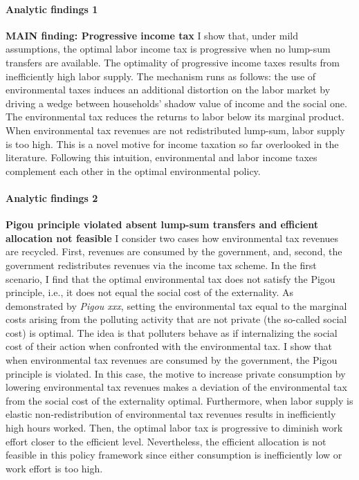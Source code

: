\paragraph{Analytic findings 1}
\textbf{MAIN finding: Progressive income tax} I show that, under mild assumptions, the optimal labor income tax is progressive when no lump-sum transfers are available. 
The optimality of progressive income taxes results from inefficiently high labor supply. The mechanism runs as follows: the use of environmental taxes induces an additional distortion on the labor market by driving a wedge between households' shadow value of income and the social one. The environmental tax reduces the returns to labor below its marginal product. When environmental tax revenues are not redistributed lump-sum, labor supply is too high. 
This is a novel motive for income taxation so far overlooked in the literature.
Following this intuition, environmental and labor income taxes complement each other in the optimal environmental policy.
  
\paragraph{Analytic findings 2}
\textbf{Pigou principle violated absent lump-sum transfers and efficient allocation not feasible}
I consider two cases how environmental tax revenues are recycled. First, revenues are consumed by the government, and, second, the government redistributes revenues via the income tax scheme. In the first scenario, I find that the optimal environmental tax does not satisfy the Pigou principle, i.e., it does not equal the social cost of the externality. As demonstrated by \textit{Pigou xxx}, setting the environmental tax equal to the marginal costs arising from the polluting activity that are not private (the so-called social cost) is optimal. The idea is that polluters behave as if internalizing the social cost of their action when confronted with the environmental tax. I show that when environmental tax revenues are consumed by the government, the Pigou principle is violated. In this case, the motive to increase private consumption by lowering environmental tax revenues makes a deviation of the environmental tax from the social cost of the externality optimal.
Furthermore, when labor supply is elastic non-redistribution of environmental tax revenues results in inefficiently high hours worked. Then, the optimal labor tax is progressive to diminish work effort closer to the efficient level.
Nevertheless, the efficient allocation is not feasible in this policy framework since either consumption is inefficiently low or work effort is too high. 


